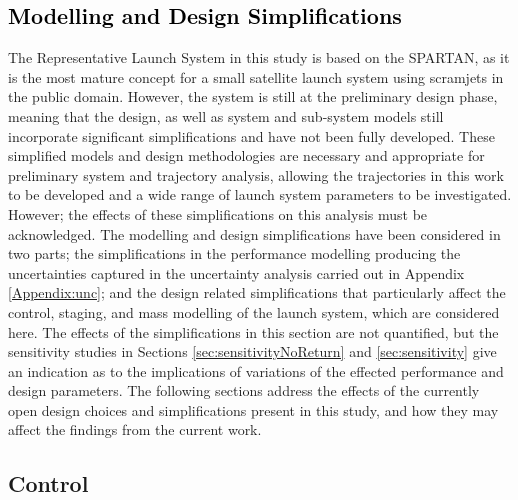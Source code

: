 \textcolor{black}{
\section{Modelling and Design Simplifications}\label{sec:simpl} 
}
\noindent
The Representative Launch System in this study is based on the SPARTAN\cite{Preller2017b}, as it is the most mature concept for a small satellite launch system using scramjets in the public domain. However, the system is still at the preliminary design phase, meaning that the design, as well as system and sub-system models still incorporate significant simplifications and have not been fully developed. These simplified models and design methodologies are necessary and appropriate for preliminary system and trajectory analysis, allowing the trajectories in this work to be developed and a wide range of launch system parameters to be investigated. However; the effects of these simplifications on this analysis must be acknowledged.
The modelling and design simplifications have been considered in two parts; the simplifications in the performance modelling producing the uncertainties captured in the uncertainty analysis carried out in Appendix \ref{Appendix:unc}; and the design related simplifications that particularly affect the control, staging, and mass modelling of the launch system, which are considered here. The effects of the simplifications in this section are not quantified, but the sensitivity studies in Sections \ref{sec:sensitivityNoReturn} and \ref{sec:sensitivity} give an indication as to the implications of variations of the effected performance and design parameters.
The following sections address the effects of the currently open design choices and simplifications present in this study, and how they may affect the findings from the current work. 

\subsection{Control}
